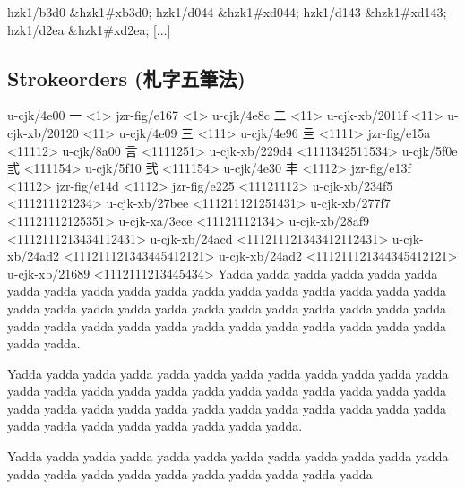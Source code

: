 \begin{multicols}{2}
[...]

hzk1/b3d0	\&hzk1\#xb3d0;	
hzk1/d044	\&hzk1\#xd044;	
hzk1/d143	\&hzk1\#xd143;	
hzk1/d2ea	\&hzk1\#xd2ea;	
[...]
\endgroup{}
\subsection{Strokeorders ({\cjk{}札字五筆法})
}
\begingroup\mktsObeyAllLines\mktsStyleCode{}u-cjk/4e00	{\cjk{}一}	<1>
jzr-fig/e167	{	}<1>
u-cjk/4e8c	{\cjk{}二}	<11>
u-cjk-xb/2011f	{	}<11>
u-cjk-xb/20120	{	}<11>
u-cjk/4e09	{\cjk{}三}	<111>
u-cjk/4e96	{\cjk{}亖}	<1111>
jzr-fig/e15a	{	}<11112>
u-cjk/8a00	{\cjk{}言}	<1111251>
u-cjk-xb/229d4	{	}<1111342511534>
u-cjk/5f0e	{\cjk{}弎}	<111154>
u-cjk/5f10	{\cjk{}弐}	<111154>
u-cjk/4e30	{\cjk{}丰}	<1112>
jzr-fig/e13f	{	}<1112>
jzr-fig/e14d	{	}<1112>
jzr-fig/e225	{	}<11121112>
u-cjk-xb/234f5	{	}<111211121234>
u-cjk-xb/27bee	{	}<111211121251431>
u-cjk-xb/277f7	{	}<11121112125351>
u-cjk-xa/3ece	{	}<11121112134>
u-cjk-xb/28af9	{	}<1112111213434112431>
u-cjk-xb/24acd	{	}<111211121343412112431>
u-cjk-xb/24ad2	{	}<111211121343445412121>
u-cjk-xb/24ad2	{	}<111211121344345412121>
u-cjk-xb/21689	{	}<1112111213445434>
\endgroup{}Yadda yadda yadda yadda yadda yadda yadda yadda yadda yadda yadda
yadda yadda yadda yadda yadda yadda yadda yadda yadda yadda yadda
yadda yadda yadda yadda yadda yadda yadda yadda yadda yadda yadda
yadda yadda yadda yadda yadda yadda yadda yadda yadda yadda yadda.\mktsShowpar\par
Yadda yadda yadda yadda yadda yadda yadda yadda yadda yadda yadda
yadda yadda yadda yadda yadda yadda yadda yadda yadda yadda yadda
yadda yadda yadda yadda yadda yadda yadda yadda yadda yadda yadda
yadda yadda yadda yadda yadda yadda yadda yadda yadda yadda yadda.\mktsShowpar\par
Yadda yadda yadda yadda yadda yadda yadda yadda yadda yadda yadda
yadda yadda yadda yadda yadda yadda yadda yadda yadda yadda yadda

\end{multicols}
